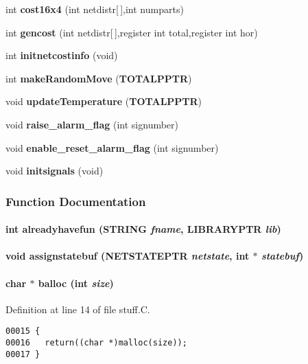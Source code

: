 \begin{CompactItemize}
\item 
int {\bf cost16x4} (int netdistr[$\,$],int numparts)
\item 
int {\bf gencost} (int netdistr[$\,$],register int total,register int hor)
\item 
int {\bf initnetcostinfo} (void)
\item 
int {\bf make\-Random\-Move} ({\bf TOTALPPTR})
\item 
void {\bf update\-Temperature} ({\bf TOTALPPTR})
\item 
void {\bf raise\_\-alarm\_\-flag} (int signumber)
\item 
void {\bf enable\_\-reset\_\-alarm\_\-flag} (int signumber)
\item 
void {\bf initsignals} (void)
\end{CompactItemize}


\subsubsection{Function Documentation}
\label{part.h_a22}
\paragraph{\setlength{\rightskip}{0pt plus 5cm}int alreadyhavefun (STRING {\em fname}, LIBRARYPTR {\em lib})}\hfill

\label{part.h_a13}
\paragraph{\setlength{\rightskip}{0pt plus 5cm}void assignstatebuf ({\bf NETSTATEPTR} {\em netstate}, int $\ast$ {\em statebuf})}\hfill

\label{part.h_a23}
\paragraph{\setlength{\rightskip}{0pt plus 5cm}char $\ast$ balloc (int {\em size})}\hfill



Definition at line 14 of file stuff.C.\small\begin{verbatim}00015 {
00016   return((char *)malloc(size));
00017 }
\end{verbatim}\normalsize 
\label{part.h_a24}
